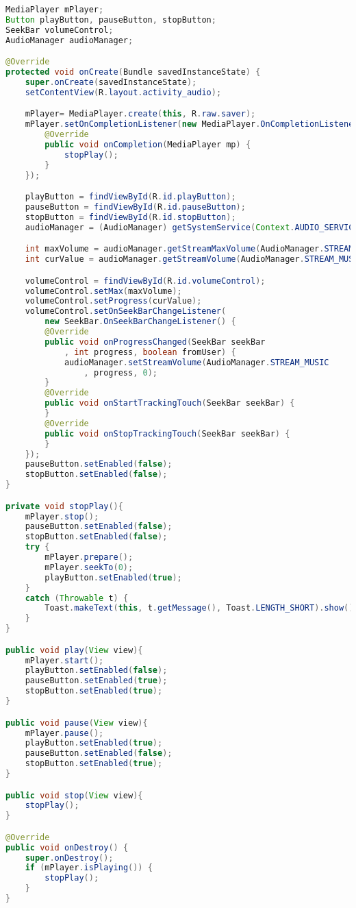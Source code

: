 \begin{lstlisting}[language=Java
	, label=lst:
	]
MediaPlayer mPlayer;
Button playButton, pauseButton, stopButton;
SeekBar volumeControl;
AudioManager audioManager;

@Override
protected void onCreate(Bundle savedInstanceState) {
	super.onCreate(savedInstanceState);
	setContentView(R.layout.activity_audio);

	mPlayer= MediaPlayer.create(this, R.raw.saver);
	mPlayer.setOnCompletionListener(new MediaPlayer.OnCompletionListener() {
		@Override
		public void onCompletion(MediaPlayer mp) {
			stopPlay();
		}
	});

	playButton = findViewById(R.id.playButton);
	pauseButton = findViewById(R.id.pauseButton);
	stopButton = findViewById(R.id.stopButton);
	audioManager = (AudioManager) getSystemService(Context.AUDIO_SERVICE);

	int maxVolume = audioManager.getStreamMaxVolume(AudioManager.STREAM_MUSIC);
	int curValue = audioManager.getStreamVolume(AudioManager.STREAM_MUSIC);

	volumeControl = findViewById(R.id.volumeControl);
	volumeControl.setMax(maxVolume);
	volumeControl.setProgress(curValue);
	volumeControl.setOnSeekBarChangeListener(
		new SeekBar.OnSeekBarChangeListener() {
		@Override
		public void onProgressChanged(SeekBar seekBar
			, int progress, boolean fromUser) {
			audioManager.setStreamVolume(AudioManager.STREAM_MUSIC
				, progress, 0);
		}
		@Override
		public void onStartTrackingTouch(SeekBar seekBar) {
		}
		@Override
		public void onStopTrackingTouch(SeekBar seekBar) {
		}
	});
	pauseButton.setEnabled(false);
	stopButton.setEnabled(false);
}

private void stopPlay(){
	mPlayer.stop();
	pauseButton.setEnabled(false);
	stopButton.setEnabled(false);
	try {
		mPlayer.prepare();
		mPlayer.seekTo(0);
		playButton.setEnabled(true);
	}
	catch (Throwable t) {
		Toast.makeText(this, t.getMessage(), Toast.LENGTH_SHORT).show();
	}
}

public void play(View view){
	mPlayer.start();
	playButton.setEnabled(false);
	pauseButton.setEnabled(true);
	stopButton.setEnabled(true);
}

public void pause(View view){
	mPlayer.pause();
	playButton.setEnabled(true);
	pauseButton.setEnabled(false);
	stopButton.setEnabled(true);
}

public void stop(View view){
	stopPlay();
}

@Override
public void onDestroy() {
	super.onDestroy();
	if (mPlayer.isPlaying()) {
		stopPlay();
	}
}
\end{lstlisting}

